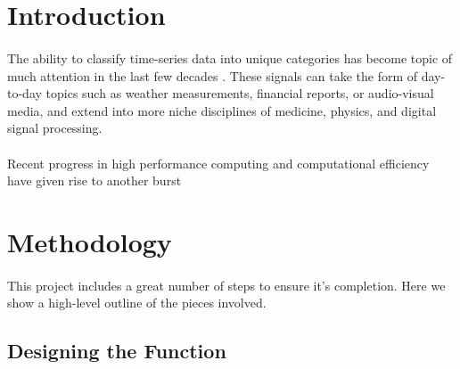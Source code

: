 \documentclass[12pt,letterpaper]{article}
\begin{document}
\begin{abstract}

\end{abstract}

\newpage
\section{Introduction}
\label{sec-Introduction}

\paragraph*{}The ability to classify time-series data into unique categories has become topic of much attention in the last few decades \cite{Khan}. These signals can take the form of day-to-day topics such as weather measurements, financial reports, or audio-visual media, and extend into more niche disciplines of medicine, physics, and digital signal processing. 


\paragraph*{}Recent progress in high performance computing and computational efficiency have given rise to another burst 


\newpage
\section{Methodology}
\label{sec-Methodology}

\paragraph*{}This project includes a great number of steps to ensure it's completion. Here we show a high-level outline of the pieces involved.


\subsection{Designing the Function}
\end{document}
